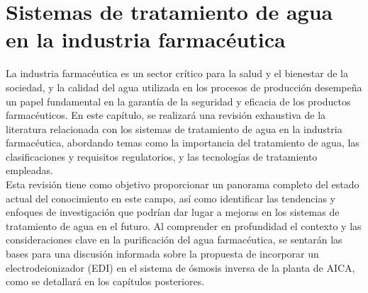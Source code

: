 \section{Sistemas de tratamiento de agua en la industria farmacéutica}

La industria farmacéutica es un sector crítico para la salud y el bienestar de la sociedad, y la calidad del agua utilizada en los procesos de producción desempeña un papel fundamental en la garantía de la seguridad y eficacia de los productos farmacéuticos. En este capítulo, se realizará una revisión exhaustiva de la literatura relacionada con los sistemas de tratamiento de agua en la industria farmacéutica, abordando temas como la importancia del tratamiento de agua, las clasificaciones y requisitos regulatorios, y las tecnologías de tratamiento empleadas.\\

Esta revisión tiene como objetivo proporcionar un panorama completo del estado actual del conocimiento en este campo, así como identificar las tendencias y enfoques de investigación que podrían dar lugar a mejoras en los sistemas de tratamiento de agua en el futuro. Al comprender en profundidad el contexto y las consideraciones clave en la purificación del agua farmacéutica, se sentarán las bases para una discusión informada sobre la propuesta de incorporar un electrodeionizador (EDI) en el sistema de ósmosis inversa de la planta de AICA, como se detallará en los capítulos posteriores.








